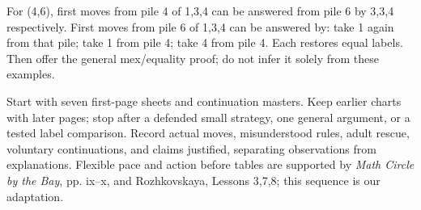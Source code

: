\documentclass[11pt]{article}
\begin{document}
For (4,6), first moves from pile 4 of 1,3,4 can be answered from pile 6 by 3,3,4 respectively. First moves from pile 6 of 1,3,4 can be answered by: take 1 again from that pile; take 1 from pile 4; take 4 from pile 4. Each restores equal labels. Then offer the general mex/equality proof; do not infer it solely from these examples.

Start with seven first-page sheets and continuation masters. Keep earlier charts with later pages; stop after a defended small strategy, one general argument, or a tested label comparison. Record actual moves, misunderstood rules, adult rescue, voluntary continuations, and claims justified, separating observations from explanations. Flexible pace and action before tables are supported by \emph{Math Circle by the Bay}, pp. ix--x, and Rozhkovskaya, Lessons 3,7,8; this sequence is our adaptation.
\end{document}
